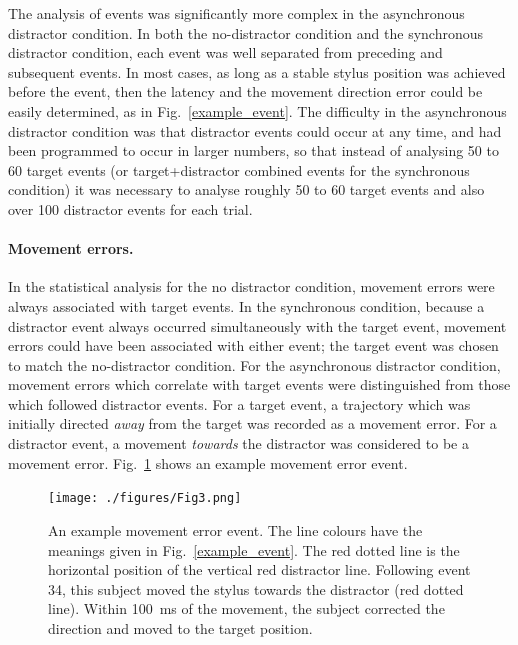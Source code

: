 \documentclass[10pt,letterpaper]{article}
\begin{document}
The analysis of events was significantly more complex in the
asynchronous distractor condition. In both the no-distractor condition
and the synchronous distractor condition, each event was well
separated from preceding and subsequent events. In most cases, as long
as a stable stylus position was achieved before the event, then the
latency and the movement direction error could be easily determined,
as in Fig.~\ref{example_event}. The difficulty in the asynchronous
distractor condition was that distractor events could occur at any
time, and had been programmed to occur in larger numbers, so that
instead of analysing 50 to 60 target events (or target+distractor
combined events for the synchronous condition) it was necessary to
analyse roughly 50 to 60 target events and also over 100 distractor
events for each trial.

\paragraph{Movement errors.} In the statistical analysis for the no
distractor condition, movement errors were always associated with
target events. In the synchronous condition, because a distractor
event always occurred simultaneously with the target event, movement
errors could have been associated with either event; the target event
was chosen to match the no-distractor condition. For the
asynchronous distractor condition, movement errors which correlate
with target events were distinguished from those which followed
distractor events. For a target event, a trajectory which was initially
directed \emph{away} from the target was recorded as a movement error. For a
distractor event, a movement \emph{towards} the distractor was considered to
be a movement error. Fig.~\ref{example_errorevent} shows an example movement
error event.

\begin{figure}[htb!]
\centering
\texttt{[image: ./figures/Fig3.png]}
\caption[Example error event] {An example movement error event. The
  line colours have the meanings given in
  Fig.~\ref{example_event}. The red dotted line is the horizontal
  position of the vertical red distractor line. Following event 34,
  this subject moved the stylus towards the distractor (red dotted
  line). Within 100~ms of the movement, the subject corrected the
  direction and moved to the target position.}
\label{example_errorevent}
\end{figure}
\end{document}
